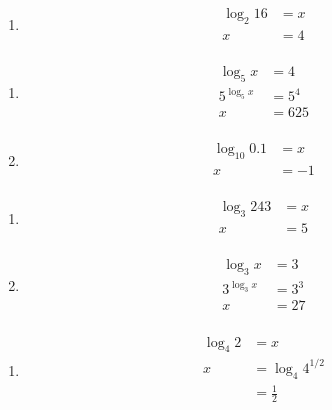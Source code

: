 \documentclass{exam}
\begin{document}
\begin{description}
\begin{enumerate}[a]
        \item 
          \begin{align*}
            \log_2 16     &= x \\
            x &= 4 \\
          \end{align*}
      \end{enumerate}

    \item[26]
      \begin{enumerate}[a]
        \item 
          \begin{align*}
            \log_5 x     &= 4 \\
            5^{\log_5 x} &= 5^4 \\
            x            &= 625 \\
          \end{align*}

        \item 
          \begin{align*}
            \log_{10} 0.1 &= x \\
            x &= -1 \\
          \end{align*}
      \end{enumerate}

    \item[27]
      \begin{enumerate}[a]
        \item 
          \begin{align*}
            \log_3 243 &= x \\
            x &= 5 \\
          \end{align*}

        \item 
          \begin{align*}
            \log_3 x     &= 3 \\
            3^{\log_3 x} &= 3^3 \\
            x            &= 27 \\
          \end{align*}
      \end{enumerate}

    \item[28]
      \begin{enumerate}[a]
        \item 
          \begin{align*}
            \log_4 2 &= x \\
            x        &= \log_4 4^{1/2} \\
                     &= \frac{1}{2} \\
          \end{align*}


\end{enumerate}
\end{description}
\end{document}
